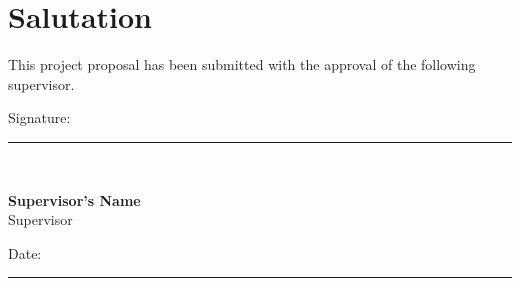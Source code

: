 \chapter*{Salutation}


\vspace{1mm}

\par\vspace{1mm}
This project proposal has been submitted with the approval of the following
supervisor.



\vspace{5mm}

Signature:  \rule{50mm}{0.5pt}\\
\par\vspace{8mm}
\textbf{Supervisor's Name}\\
Supervisor
\par\vspace{10mm}
Date: \rule{50mm}{0.5pt}\\
